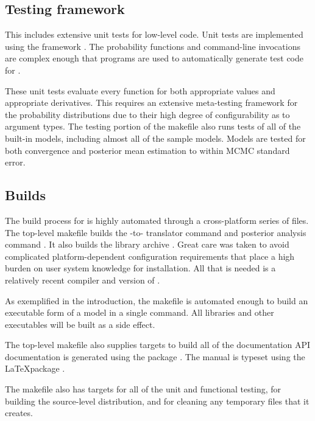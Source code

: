 \documentclass[article]{jss}
\begin{document}
\subsection{Testing framework}

This includes extensive unit tests for low-level  code.
Unit tests are implemented using the  framework
\citep{GoogleTest:2011}.  The probability functions and command-line
invocations are complex enough that programs are used to automatically
generate test code for .

These unit tests evaluate every function for both appropriate values
and appropriate derivatives.  This requires an extensive meta-testing
framework for the probability distributions due to their high degree
of configurability as to argument types.  The testing portion of the
makefile also runs tests of all of the built-in models, including
almost all of the  sample models.  Models are tested
for both convergence and posterior mean estimation to within MCMC
standard error.


\subsection{Builds}

The build process for  is highly automated through a
cross-platform series of  files.  The top-level makefile
builds the -to- translator command
 and posterior analysis command .  It
also builds the library archive .  Great care was
taken to avoid complicated platform-dependent configuration
requirements that place a high burden on user system knowledge for
installation.  All that is needed is a relatively recent
 compiler and version of .

As exemplified in the introduction, the makefile is automated enough
to build an executable form of a  model in a single
command.  All libraries and other executables will be built as a side
effect.  

The top-level makefile also supplies targets to build all of the
documentation  API documentation is generated using the
 package \citep{Doxygen:2011}.  The 
manual \citep{Stan:2013} is typeset using the \LaTeX package
\citep{MittelbachEtAl:2004}.

The makefile also has targets for all of the unit and functional
testing, for building the source-level distribution, and for cleaning
any temporary files that it creates.
\end{document}
